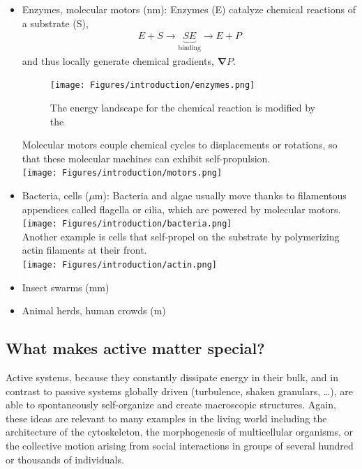 \begin{itemize}
    \item Enzymes, molecular motors (nm): Enzymes (E) catalyze chemical reactions of a substrate (S),
    \begin{align}
        E + S \longrightarrow  \underbrace{SE}_{\mathrm{binding}} \longrightarrow  E + P
    \end{align}
     and thus locally generate chemical gradients, $\bm \nabla P$. 
     \begin{figure}[H]
        \centering
        \texttt{[image: Figures/introduction/enzymes.png]}
        \caption{The energy landscape for the chemical reaction is modified by the }
        \label{fig: enzymes}
    \end{figure}
     Molecular motors couple chemical cycles to displacements or rotations, so that these molecular machines can exhibit self-propulsion.\\
     \texttt{[image: Figures/introduction/motors.png]}
    \item Bacteria, cells ($\mu$m): Bacteria and algae usually move thanks to filamentous appendices called flagella or cilia, which are powered by molecular motors.
    \\
    \texttt{[image: Figures/introduction/bacteria.png]} 
    \\
    Another example is cells that self-propel on the substrate by polymerizing actin filaments at their front.
    \\
    \texttt{[image: Figures/introduction/actin.png]}
    \item Insect swarms (mm)
    \item Animal herds, human crowds (m)
\end{itemize}



\subsection{What makes active matter special?}

Active systems, because they constantly dissipate energy in their bulk, and in contrast to passive systems globally driven (turbulence, shaken granulars, \ldots), are able to spontaneously self-organize and create macroscopic structures. 
Again, these ideas are relevant to many examples in the living world including the architecture of the cytoskeleton, the morphogenesis of multicellular organisms, or the collective motion arising from social interactions in groups of several hundred or thousands of individuals. 

